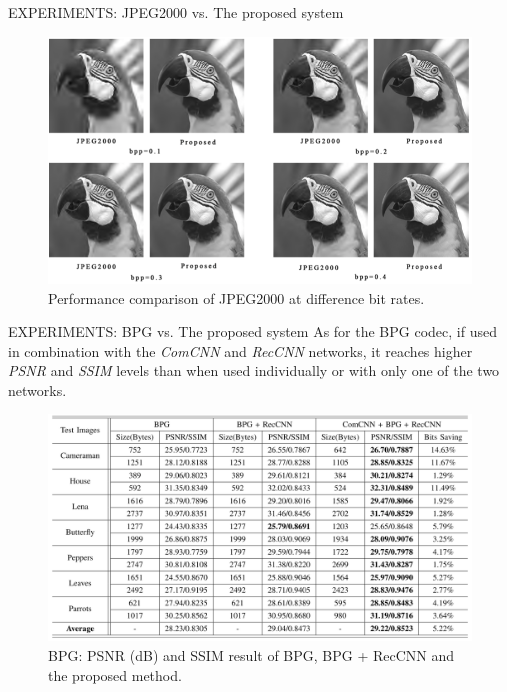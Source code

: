 \begin{frame}{EXPERIMENTS: JPEG2000 vs. The proposed system}
\begin{minipage}{\linewidth}
\begin{minipage}{0.45\linewidth}
            \begin{figure}[htbp]
                \centering
                \includegraphics[width = 1 \linewidth]{images/paper3/JPEG2000p.png}
                \caption{Performance comparison of JPEG2000 at difference bit rates.}
                \label{fig:parrot}
                \centering
            \end{figure}
        \end{minipage}
    \end{minipage}
\end{frame}

\begin{frame}{EXPERIMENTS: BPG vs. The proposed system}
    As for the BPG codec, if used in combination with the \emph{ComCNN} and 
    \emph{RecCNN} networks, it reaches higher \emph{PSNR} and \emph{SSIM} levels than when 
    used individually or with only one of the two networks.   
    \begin{figure}[htbp]
        \centering
        \includegraphics[width = 1 \linewidth]{images/paper3/BPG.png}
        \centering
        \caption{BPG: PSNR (dB) and SSIM result of BPG, BPG + RecCNN and the proposed method.}
        \label{fig:BPG}
    \end{figure}
\end{frame}

